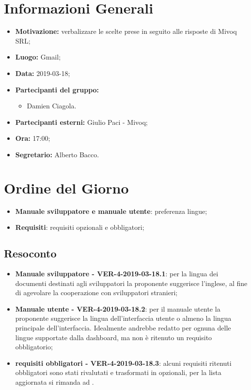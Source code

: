 \documentclass[a4paper, oneside, openany, dvipsnames, table]{article}
\begin{document}
\copertina{}


\newpage
\tableofcontents
\newpage
\section{Informazioni Generali}
\begin{itemize}
\item \textbf{Motivazione:} verbalizzare le scelte prese in seguito alle risposte di Mivoq SRL;
\item \textbf{Luogo:} Gmail;
\item \textbf{Data:} 2019-03-18;
\item \textbf{Partecipanti del gruppo:} \hfill
	\begin{itemize}
	\item Damien Ciagola.
	\end{itemize} 
\item \textbf{Partecipanti esterni:} Giulio Paci - Mivoq;
\item \textbf{Ora:} 17:00;
\item \textbf{Segretario:} Alberto Bacco.
\end{itemize}

\section{Ordine del Giorno}
\begin{itemize}
	\item \textbf{Manuale sviluppatore e manuale utente}: preferenza lingue;
	\item \textbf{Requisiti}: requisiti opzionali e obbligatori;
\end{itemize}

\subsection{Resoconto}
\begin{itemize}
\item \textbf{Manuale sviluppatore - VER-4-2019-03-18.1}: 
	per la lingua dei documenti destinati agli sviluppatori 
	la proponente suggerisce l'inglese, al fine di agevolare la cooperazione 
	con sviluppatori stranieri;
\item \textbf{Manuale utente - VER-4-2019-03-18.2}:
	per il manuale utente la proponente suggerisce la lingua dell'interfaccia 
	utente o almeno la lingua principale dell'interfaccia.
	Idealmente andrebbe redatto per ognuna delle lingue supportate 
	dalla dashboard, ma non è ritenuto un requisito obbligatorio;
\item \textbf{requisiti obbligatori - VER-4-2019-03-18.3}: 
	alcuni requisiti ritenuti obbligatori sono stati rivalutati e trasformati in opzionali, 
	per la lista aggiornata si 	rimanda ad \AdR .
\end{itemize}
\end{document}
